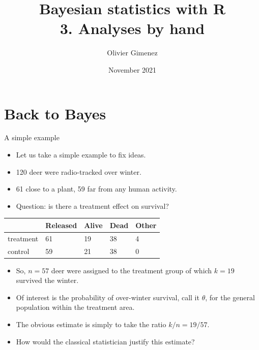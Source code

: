 \documentclass[
  ignorenonframetext,
  aspectratio=169]{beamer}
\title{Bayesian statistics with R\\
3. Analyses by hand}
\author{Olivier Gimenez}
\date{November 2021}
\providecommand{\tightlist}{%
  \setlength{\itemsep}{0pt}\setlength{\parskip}{0pt}}
\begin{document}
\frame{\titlepage}

\hypertarget{back-to-bayes}{%
\section{Back to Bayes}\label{back-to-bayes}}

\begin{frame}{A simple example}
\protect\hypertarget{a-simple-example}{}
\begin{itemize}
\tightlist
\item
  Let us take a simple example to fix ideas.
\item
  120 deer were radio-tracked over winter.
\item
  61 close to a plant, 59 far from any human activity.
\item
  Question: is there a treatment effect on survival?
\end{itemize}

\begin{longtable}[]{@{}lllll@{}}
\toprule
& Released & Alive & Dead & Other \\
\midrule
\endhead
treatment & 61 & 19 & 38 & 4 \\
control & 59 & 21 & 38 & 0 \\
\bottomrule
\end{longtable}
\end{frame}

\begin{frame}
\begin{itemize}[<+->]
\tightlist
\item
  So, \(n = 57\) deer were assigned to the treatment group of which
  \(k=19\) survived the winter.
\end{itemize}

\begin{itemize}[<+->]
\tightlist
\item
  Of interest is the probability of over-winter survival, call it
  \(\theta\), for the general population within the treatment area.
\end{itemize}

\begin{itemize}[<+->]
\tightlist
\item
  The obvious estimate is simply to take the ratio \(k/n=19/57\).
\end{itemize}

\begin{itemize}[<+->]
\tightlist
\item
  How would the classical statistician justify this estimate?
\end{itemize}
\end{frame}
\end{document}

